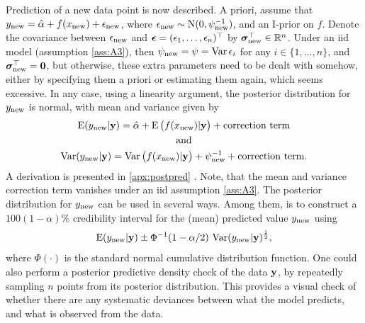 Prediction of a new data point is now described.
A priori, assume that $y_{\text{new}} = \hat\alpha + f(x_{\text{new}}) + \epsilon_{\text{new}}$, where $\epsilon_{\text{new}} \sim \operatorname{N}(0,\psi^{-1}_{\text{new}})$, and an I-prior on $f$.
Denote the covariance between $\epsilon_{\text{new}}$ and ${\bm\epsilon} = (\epsilon_1,\dots,\epsilon_n)^\top$ by ${\bm\sigma}_{\text{new}}^\top \in \mathbb{R}^n$.
Under an iid model (assumption \ref{ass:A3}), then $\psi_{\text{new}} = \psi = \operatorname{Var} \epsilon_i$ for any $i\in\{1,\dots,n\}$, and ${\bm\sigma}_{\text{new}}^\top={\mathbf 0}$, but otherwise, these extra parameters need to be dealt with somehow, either by specifying them a priori or estimating them again, which seems excessive.
In any case, using a linearity argument, the posterior distribution for $y_{\text{new}}$ is normal, with mean and variance given by
\begin{gather}
  \operatorname{E}(y_{\text{new}}|{\mathbf y}) = \hat\alpha + \operatorname{E} \big( f(x_{\text{new}}) |{\mathbf y} \big) + \text{correction term} \\
  \text{and} \nonumber \\
  \operatorname{Var}(y_{\text{new}}|{\mathbf y}) 
  = \operatorname{Var}\big(f(x_{\text{new}})|{\mathbf y}\big) + \psi^{-1}_{\text{new}} + \text{correction term}.
\end{gather}
A derivation is presented in \cref{apx:postpred} .
Note, that the mean and variance correction term vanishes under an iid assumption \ref{ass:A3}.
The posterior distribution for $y_{\text{new}}$ can be used in several ways. 
Among them, is to construct a $100(1 - \alpha)\%$ credibility interval for the (mean) predicted value $y_{\text{new}}$ using
\[
  \operatorname{E}(y_{\text{new}}|{\mathbf y}) \pm \Phi^{-1}(1 - \alpha/2) \, \operatorname{Var}(y_{\text{new}}|{\mathbf y})^{\frac{1}{2}},
\]
where $\Phi(\cdot)$ is the standard normal cumulative distribution function.
One could also perform a posterior predictive density check of the data ${\mathbf y}$, by repeatedly sampling $n$ points from its posterior distribution.
This provides a visual check of whether there are any systematic deviances between what the model predicts, and what is observed from the data.

